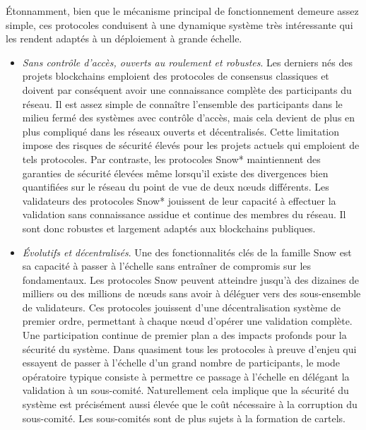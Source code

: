 \documentclass[runningheads,francais,a4paper]{llncs}
\begin{document}
Étonnamment, bien que le mécanisme principal de fonctionnement demeure assez simple, ces protocoles conduisent à une
dynamique système très intéressante qui les rendent adaptés à un déploiement à grande échelle.
\begin{itemize}
\item \textit{Sans contrôle d'accès, ouverts au roulement et robustes}. Les derniers nés des projets blockchains
emploient des protocoles de consensus classiques et doivent par conséquent avoir une connaissance complète des
participants du réseau. Il est assez simple de connaître l'ensemble des participants dans le milieu fermé des systèmes
avec contrôle d'accès, mais cela devient de plus en plus compliqué dans les réseaux ouverts et décentralisés. Cette
limitation impose des risques de sécurité élevés pour les projets actuels qui emploient de tels protocoles. Par
contraste, les protocoles Snow* maintiennent des garanties de sécurité élevées même lorsqu'il existe des divergences
bien quantifiées sur le réseau du point de vue de deux nœuds différents. Les validateurs des protocoles Snow* jouissent
de leur capacité à effectuer la validation sans connaissance assidue et continue des membres du réseau. Il sont donc
robustes et largement adaptés aux blockchains publiques.
\item \textit{Évolutifs et décentralisés}. Une des fonctionnalités clés de la famille Snow est sa capacité à passer à
l'échelle sans entraîner de compromis sur les fondamentaux. Les protocoles Snow peuvent atteindre jusqu'à des dizaines
de milliers ou des millions de nœuds sans avoir à déléguer vers des sous-ensemble de validateurs. Ces protocoles
jouissent d'une décentralisation système de premier ordre, permettant à chaque nœud d'opérer une validation complète.
Une participation continue de premier plan a des impacts profonds pour la sécurité du système. Dans quasiment tous
les protocoles à preuve d'enjeu qui essayent de passer à l'échelle d'un grand nombre de participants, le mode opératoire
typique consiste à permettre ce passage à l'échelle en délégant la validation à un sous-comité. Naturellement cela
implique que la sécurité du système est précisément aussi élevée que le coût nécessaire à la corruption du sous-comité.
Les sous-comités sont de plus sujets à la formation de cartels.


\end{itemize}
\end{document}
